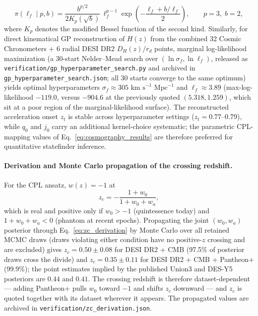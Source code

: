 \documentclass[11pt,letterpaper]{article}
\begin{document}
\begin{equation}
    \pi(\ell_f \mid p, b) = \frac{b^{p/2}}{2 K_p(\sqrt{b})}\, \ell_f^{p-1} \exp\!\left( -\frac{\ell_f + b/\ell_f}{2} \right), \qquad p = 3,\; b = 2,
    \label{eq:gig_prior}
\end{equation}
where $K_p$ denotes the modified Bessel function of the second kind. Similarly, for direct kinematical GP reconstruction of $H(z)$ from the combined 32 Cosmic Chronometers + 6 radial DESI DR2 $D_H(z)/r_d$ points, marginal log-likelihood maximization (a 30-start Nelder--Mead search over $(\ln\sigma_f, \ln\ell_f)$, released as \texttt{verification/gp\_hyperparameter\_search.py} and archived in \texttt{gp\_hyperparameter\_search.json}; all 30 starts converge to the same optimum) yields optimal hyperparameters $\sigma_f \approx 305\text{ km s}^{-1}\text{ Mpc}^{-1}$ and $\ell_f \approx 3.89$ (max-log-likelihood $-119.0$, versus $-904.6$ at the previously quoted $(5.318, 1.259)$, which sit at a poor region of the marginal-likelihood surface). The reconstructed acceleration onset $z_t$ is stable across hyperparameter settings ($z_t = 0.77\text{--}0.79$), while $q_0$ and $j_0$ carry an additional kernel-choice systematic; the parametric CPL-mapping values of Eq.~\ref{eq:cosmography_results} are therefore preferred for quantitative statefinder inference.

\paragraph{Derivation and Monte Carlo propagation of the crossing redshift.} For the CPL ansatz, $w(z) = -1$ at
\begin{equation}
    z_c = -\frac{1+w_0}{1+w_0+w_a},
    \label{eq:zc_derivation}
\end{equation}
which is real and positive only if $w_0 > -1$ (quintessence today) and $1 + w_0 + w_a < 0$ (phantom at recent epochs). Propagating the joint $(w_0, w_a)$ posterior through Eq.~\ref{eq:zc_derivation} by Monte Carlo over all retained MCMC draws (draws violating either condition have no positive-$z$ crossing and are excluded) gives $z_c = 0.50 \pm 0.08$ for DESI DR2 + CMB (97.5\% of posterior draws cross the divide) and $z_c = 0.35 \pm 0.11$ for DESI DR2 + CMB + Pantheon+ (99.9\%); the point estimates implied by the published Union3 and DES-Y5 posteriors are $0.44$ and $0.41$. The crossing redshift is therefore dataset-dependent --- adding Pantheon+ pulls $w_0$ toward $-1$ and shifts $z_c$ downward --- and $z_c$ is quoted together with its dataset wherever it appears. The propagated values are archived in \texttt{verification/zc\_derivation.json}.
\end{document}
